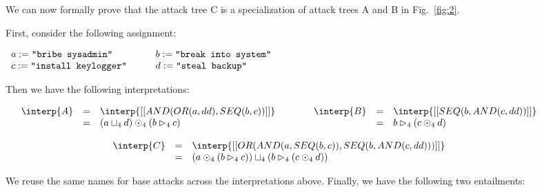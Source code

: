 We can now formally prove that the attack tree C is a specialization
of attack trees A and B in Fig.~\ref{fig:2}.
\begin{example}
  \label{ex:ex1}
  First, consider the following assignment:
\begin{center}
  \begin{math}
    \begin{array}{lllllll}
      a := \verb!"bribe sysadmin"!
      & \quad &
      b := \verb!"break into system"!
      \\
      c := \verb!"install keylogger"!
      & \quad &
      d := \verb!"steal backup"!
    \end{array}
  \end{math}
\end{center}
Then we have the following interpretations:
\begin{center}
  \begin{math}
    \begin{array}{c}
      \begin{array}{ccc}
        \begin{array}{rclcl}
        \interp{A} & = & \interp{[[AND(OR(a,dd),SEQ(b,c))]]} \\
                   & = & (a \sqcup_4 d) \odot_4 (b \rhd_4 c)\\
      \end{array}
      & \quad &
      \begin{array}{rclcl}
        \interp{B} & = & \interp{[[SEQ(b,AND(c,dd))]]} \\
                   & = & b \rhd_4 (c \odot_4 d)\\      
      \end{array}
      \end{array}
      \\ \\
      \begin{array}{rclcl}
        \interp{C} & = & \interp{[[OR(AND(a,SEQ(b,c)),SEQ(b,AND(c,dd)))]]}\\
                   & = & (a \odot_4 (b \rhd_4 c)) \sqcup_4 (b \rhd_4 (c \odot_4 d))\\
      \end{array}
    \end{array}        
  \end{math}
\end{center}
We reuse the same names for base attacks across the interpretations
above.  Finally, we have the following two entailments:
\begin{center}

\end{center}
\end{example}
